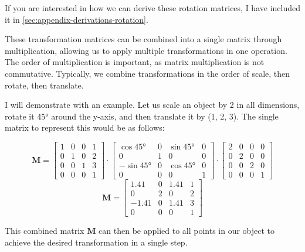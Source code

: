 \documentclass[12pt]{article}
\begin{document}
If you are interested in how we can derive these rotation matrices, I have included it in \autoref{sec:appendix-derivations-rotation}.

These transformation matrices can be combined into a single matrix through multiplication, allowing us to apply multiple transformations in one operation. The order of multiplication is important, as matrix multiplication is not commutative. Typically, we combine transformations in the order of scale, then rotate, then translate.

I will demonstrate with an example. Let us scale an object by 2 in all dimensions, rotate it 45° around the y-axis, and then translate it by (1, 2, 3). The single matrix to represent this would be as follows:

\[
    \mathbf{M} =
    \begin{bmatrix}
        1 & 0 & 0 & 1 \\
        0 & 1 & 0 & 2 \\
        0 & 0 & 1 & 3 \\
        0 & 0 & 0 & 1
    \end{bmatrix} \cdot
    \begin{bmatrix}
        \cos 45°  & 0 & \sin 45° & 0 \\
        0         & 1 & 0        & 0 \\
        -\sin 45° & 0 & \cos 45° & 0 \\
        0         & 0 & 0        & 1
    \end{bmatrix} \cdot
    \begin{bmatrix}
        2 & 0 & 0 & 0 \\
        0 & 2 & 0 & 0 \\
        0 & 0 & 2 & 0 \\
        0 & 0 & 0 & 1
    \end{bmatrix}
\]
\[
    \mathbf{M} = \begin{bmatrix}
        1.41  & 0 & 1.41 & 1 \\
        0     & 2 & 0    & 2 \\
        -1.41 & 0 & 1.41 & 3 \\
        0     & 0 & 0    & 1
    \end{bmatrix}
\]

This combined matrix $\mathbf{M}$ can then be applied to all points in our object to achieve the desired transformation in a single step.
\end{document}
